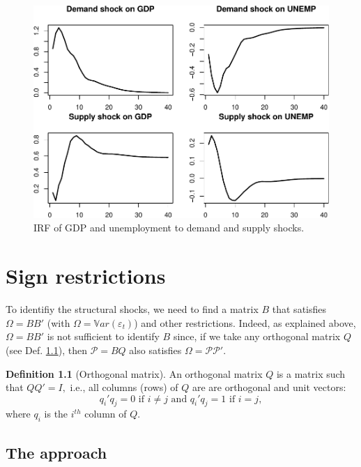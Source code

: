 \documentclass[
  12pt,
]{book}
\theoremstyle{definition}
\newtheorem{definition}{Definition}[chapter]
\theoremstyle{definition}
\theoremstyle{definition}
\theoremstyle{definition}
\theoremstyle{remark}
\begin{document}
\begin{figure}
\includegraphics[width=0.95\linewidth]{IdentifStructShocks_files/figure-latex/BQ4-1} \caption{IRF of GDP and unemployment to demand and supply shocks.}\label{fig:BQ4}
\end{figure}

\hypertarget{Signs}{%
\chapter{Sign restrictions}\label{Signs}}

To identifiy the structural shocks, we need to find a matrix \(B\) that satisfies \(\Omega = BB'\) (with \(\Omega = \mathbb{V}ar(\varepsilon_t)\)) and other restrictions. Indeed, as explained above, \(\Omega = BB'\) is not sufficient to identify \(B\) since, if we take any orthogonal matrix \(Q\) (see Def. \ref{def:orthogonal}), then \(\mathcal{P}=BQ\) also satisfies \(\Omega = \mathcal{P}\mathcal{P}'\).

\begin{definition}[Orthogonal matrix]
\protect\hypertarget{def:orthogonal}{}\label{def:orthogonal}An orthogonal matrix \(Q\) is a matrix such that \(QQ' = I,\) i.e., all columns (rows) of \(Q\) are are
orthogonal and unit vectors:
\[q_i'q_j=0\text{ if }i\neq j\text{ and }q_i'q_j=1\text{ if }i= j,\]
where \(q_i\) is the \(i^{th}\) column of \(Q\).
\end{definition}

\hypertarget{the-approach}{%
\section{The approach}\label{the-approach}}
\end{document}
